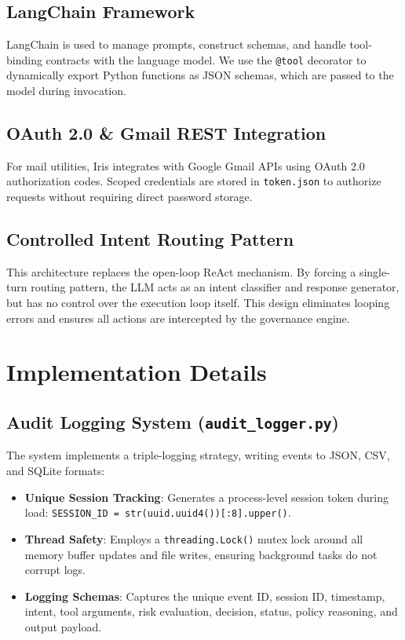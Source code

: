 \documentclass{article}
\begin{document}
\subsection{LangChain Framework}
LangChain is used to manage prompts, construct schemas, and handle tool-binding contracts with the language model. We use the \texttt{@tool} decorator to dynamically export Python functions as JSON schemas, which are passed to the model during invocation.

\subsection{OAuth 2.0 \& Gmail REST Integration}
For mail utilities, Iris integrates with Google Gmail APIs using OAuth 2.0 authorization codes. Scoped credentials are stored in \texttt{token.json} to authorize requests without requiring direct password storage.

\subsection{Controlled Intent Routing Pattern}
This architecture replaces the open-loop ReAct mechanism. By forcing a single-turn routing pattern, the LLM acts as an intent classifier and response generator, but has no control over the execution loop itself. This design eliminates looping errors and ensures all actions are intercepted by the governance engine.

\section{Implementation Details}

\subsection{Audit Logging System (\texttt{audit\_logger.py})}
The system implements a triple-logging strategy, writing events to JSON, CSV, and SQLite formats:
\begin{itemize}
    \item \textbf{Unique Session Tracking}: Generates a process-level session token during load: \texttt{SESSION\_ID = str(uuid.uuid4())[:8].upper()}.
    \item \textbf{Thread Safety}: Employs a \texttt{threading.Lock()} mutex lock around all memory buffer updates and file writes, ensuring background tasks do not corrupt logs.
    \item \textbf{Logging Schemas}: Captures the unique event ID, session ID, timestamp, intent, tool arguments, risk evaluation, decision, status, policy reasoning, and output payload.
\end{itemize}
\end{document}
